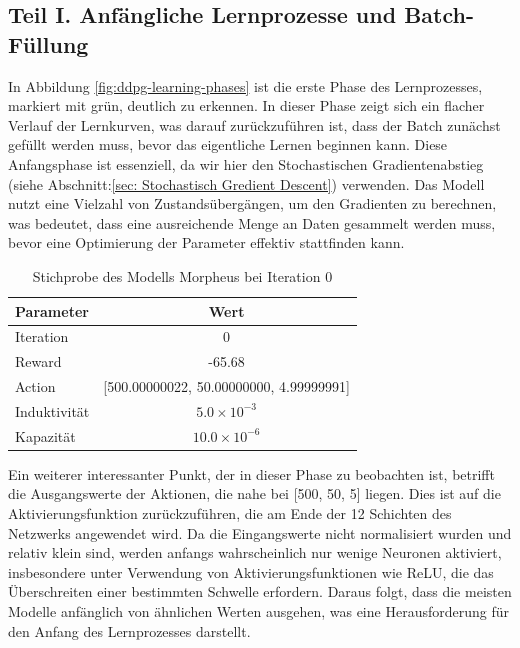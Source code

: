 \subsection{Teil I. Anfängliche Lernprozesse und Batch-Füllung}
In Abbildung \ref{fig:ddpg-learning-phases} ist die erste Phase des Lernprozesses, markiert mit grün, deutlich zu erkennen. In dieser Phase zeigt sich ein flacher Verlauf der Lernkurven, was darauf zurückzuführen ist, dass der Batch zunächst gefüllt werden muss, bevor das eigentliche Lernen beginnen kann. Diese Anfangsphase ist essenziell, da wir hier den Stochastischen Gradientenabstieg (siehe Abschnitt:\ref{sec: Stochastisch Gredient Descent})  verwenden. Das Modell nutzt eine Vielzahl von Zustandsübergängen, um den Gradienten zu berechnen, was bedeutet, dass eine ausreichende Menge an Daten gesammelt werden muss, bevor eine Optimierung der Parameter effektiv stattfinden kann.


\begin{table}[htbp]
\centering
\caption{Stichprobe des Modells Morpheus bei Iteration 0}
\label{tab:sample_morpheus}
\begin{tabular}{l c}
\hline
\textbf{Parameter} & \textbf{Wert} \\
\hline
Iteration & 0 \\
Reward & -65.68 \\
Action & [500.00000022, 50.00000000, 4.99999991] \\
Induktivität & \( 5.0 \times 10^{-3} \) \\
Kapazität & \( 10.0 \times 10^{-6} \) \\
\hline
\end{tabular}
\end{table}

Ein weiterer interessanter Punkt, der in dieser Phase zu beobachten ist, betrifft die Ausgangswerte der Aktionen, die nahe bei [500, 50, 5] liegen. Dies ist auf die Aktivierungsfunktion zurückzuführen, die am Ende der 12 Schichten des Netzwerks angewendet wird. Da die Eingangswerte nicht normalisiert wurden und relativ klein sind, werden anfangs wahrscheinlich nur wenige Neuronen aktiviert, insbesondere unter Verwendung von Aktivierungsfunktionen wie ReLU, die das Überschreiten einer bestimmten Schwelle erfordern. Daraus folgt, dass die meisten Modelle anfänglich von ähnlichen Werten ausgehen, was eine Herausforderung für den Anfang des Lernprozesses darstellt.

